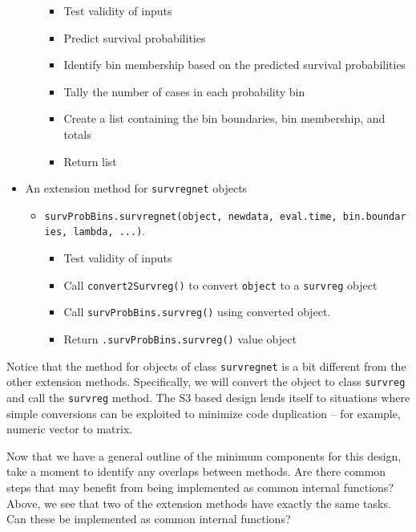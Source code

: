 \documentclass[
]{book}
\providecommand{\tightlist}{%
  \setlength{\itemsep}{0pt}\setlength{\parskip}{0pt}}
\begin{document}
\begin{itemize}
\begin{itemize}
    \begin{itemize}
    \tightlist
    \item
      Test validity of inputs
    \item
      Predict survival probabilities
    \item
      Identify bin membership based on the predicted survival probabilities
    \item
      Tally the number of cases in each probability bin
    \item
      Create a list containing the bin boundaries, bin membership, and totals
    \item
      Return list
    \end{itemize}
  \end{itemize}
\item
  An extension method for \texttt{survregnet} objects

  \begin{itemize}
  \tightlist
  \item
    \texttt{survProbBins.survregnet(object,\ newdata,\ eval.time,\ bin.boundaries,\ lambda,\ ...)}.

    \begin{itemize}
    \tightlist
    \item
      Test validity of inputs
    \item
      Call \texttt{convert2Survreg()} to convert \texttt{object} to a \texttt{survreg} object
    \item
      Call \texttt{survProbBins.survreg()} using converted object.
    \item
      Return \texttt{.survProbBins.survreg()} value object
    \end{itemize}
  \end{itemize}
\end{itemize}

Notice that the method for objects of class \texttt{survregnet} is a bit different from the other extension methods. Specifically, we will convert the object to class \texttt{survreg} and call the \texttt{survreg} method. The S3 based design lends itself to situations where simple conversions can be exploited to minimize code duplication -- for example, numeric vector to matrix.

Now that we have a general outline of the minimum components for this design, take a moment to identify any overlaps between methods. Are there common steps that may benefit from being implemented as common internal functions? Above, we see that two of the extension methods have exactly the same tasks. Can these be implemented as common internal functions?
\end{document}
